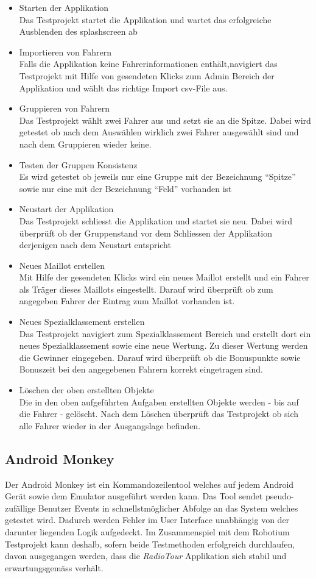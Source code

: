 \begin{itemize}
\item Starten der Applikation\\
Das Testprojekt startet die Applikation und wartet das erfolgreiche Ausblenden des \gls{splashscreen} ab
\item Importieren von Fahrern\\
Falls die Applikation keine Fahrerinformationen enthält,navigiert das Testprojekt mit Hilfe von gesendeten Klicks zum Admin Bereich der Applikation und wählt das richtige Import \gls{csv}-File aus.
\item Gruppieren von Fahrern\\
Das Testprojekt wählt zwei Fahrer aus und setzt sie an die Spitze. Dabei wird getestet ob nach dem Auswählen wirklich zwei Fahrer ausgewählt sind und nach dem Gruppieren wieder keine.
\item Testen der Gruppen Konsistenz\\
Es wird getestet ob jeweils nur eine Gruppe mit der Bezeichnung "`Spitze"' sowie nur eine mit der Bezeichnung "`Feld"' vorhanden ist
\item Neustart der Applikation\\
Das Testprojekt schliesst die Applikation und startet sie neu. Dabei wird überprüft ob der Gruppenstand vor dem Schliessen der Applikation derjenigen nach dem Neustart entspricht
\item Neues Maillot erstellen\\
Mit Hilfe der gesendeten Klicks wird ein neues Maillot erstellt und ein Fahrer als Träger dieses Maillots eingestellt. Darauf wird überprüft ob zum angegeben Fahrer der Eintrag zum Maillot vorhanden ist.
\item Neues Spezialklassement erstellen\\
Das Testprojekt navigiert zum Spezialklassement Bereich und erstellt dort ein neues Spezialklassement sowie eine neue Wertung. Zu dieser Wertung werden die Gewinner eingegeben. Darauf wird überprüft ob die Bonuspunkte sowie Bonuszeit bei den angegebenen Fahrern korrekt eingetragen sind.
\item Löschen der oben erstellten Objekte \\
Die in den oben aufgeführten Aufgaben erstellten Objekte werden - bis auf die Fahrer -  gelöscht. Nach dem Löschen überprüft das Testprojekt ob sich alle Fahrer wieder in der Ausgangslage befinden.
\end{itemize}

\subsection{Android Monkey}
Der Android Monkey ist ein Kommandozeilentool welches auf jedem Android Gerät sowie dem Emulator ausgeführt werden kann. Das Tool sendet pseudo-zufällige Benutzer Events in schnellstmöglicher Abfolge an das System welches getestet wird. Dadurch werden Fehler im User Interface unabhängig von der darunter liegenden Logik aufgedeckt. Im Zusammenspiel mit dem Robotium Testprojekt kann deshalb, sofern beide Testmethoden erfolgreich durchlaufen, davon ausgegangen werden, dass die \textit{RadioTour} Applikation sich stabil und erwartungsgemäss verhält.

